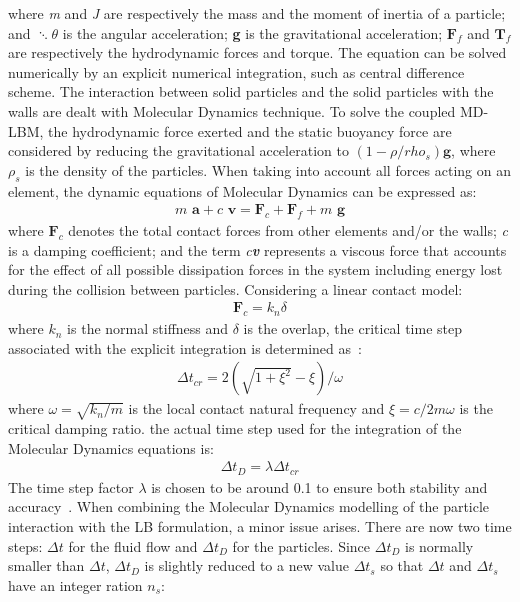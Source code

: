 where \textit{m} and \textit{J} are respectively the mass and the moment of inertia of a particle; and $\ddots{\theta}$ is the angular acceleration; \textbf{g} is the gravitational acceleration; $\textbf{F}_{f}$ and $\textbf{T}_{f}$ are respectively the hydrodynamic forces and torque. The equation can be solved numerically by an explicit numerical integration, such as central difference scheme. The interaction between solid particles and the solid particles with the walls are dealt with Molecular Dynamics technique. To solve the coupled MD-LBM, the hydrodynamic force exerted and the static buoyancy force are considered by reducing the gravitational acceleration to $(1- \rho/rho_{s})\textbf{g}$, where $\rho_{s}$ is the density of the particles. When taking into account all forces acting on an element, the dynamic equations of Molecular Dynamics can be expressed as:
\begin{align}
\textit{m}\textbf{ a} + \textit{c }\textbf{v} = \textbf{F}_{c} + \textbf{F}_{f} +\textit{m }\textbf{g}
\label{eq:mde}
\end{align} 
where $\textbf{F}_{c}$ denotes the total contact forces from other elements and/or the walls; \textit{c} is a damping coefficient; and the term \textit{c\textbf{v}} represents a viscous force that accounts for the effect of all possible dissipation forces in the system including energy lost during the collision between particles. Considering a linear contact model:
\begin{align}
\textbf{F}_{c}=\textit{k}_{\textit{n}} \delta
\end{align}
where $\textit{k}_{\textit{n}}$ is the normal stiffness and $\delta$ is the overlap, the critical time step associated with the explicit integration is determined as~\citep{he1997}:
\begin{align}
\Delta t_{\textit{cr}}= 2(\sqrt{1 + \xi^{2}}-\xi) / \omega
\end{align}
where $\omega = \sqrt{\textit{k}_{\textit{n}}/\textit{m}}$ is the local contact natural frequency and $\xi = \textit{c}/2\textit{m}\omega$ is the critical damping ratio. the actual time step used for the integration of the Molecular Dynamics equations is:
\begin{align}
\Delta \textit{t}_{D}=\lambda \Delta \textit{t}_{cr}
\end{align}
The time step factor $\lambda$ is chosen to be around 0.1 to ensure both stability and accuracy~\citep{he1997}. When combining the Molecular Dynamics modelling of the particle interaction with the LB formulation, a minor issue arises. There are now two time steps: $\Delta t$ for the fluid flow and $\Delta t_{D}$ for the particles. Since $\Delta t_{D}$ is normally smaller than $\Delta t$, $\Delta t_{D}$ is slightly reduced to a new value $\Delta t_{s}$ so that $\Delta t$ and $\Delta t_{s}$ have an integer ration $\textit{n}_{\textit{s}}$:
